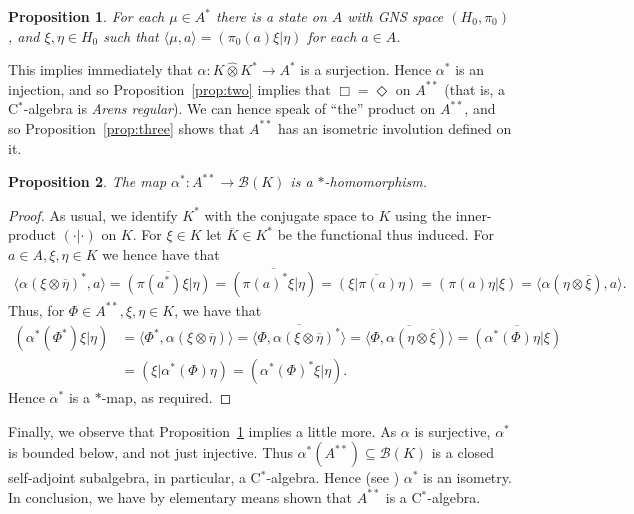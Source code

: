 \documentclass[a4paper,12pt]{article}
\theoremstyle{plain}
\newtheorem{proposition}{Proposition}[section]
\theoremstyle{definition}
\newcommand{\mc}{\mathcal}
\newcommand{\ip}[2]{\langle{#1},{#2}\rangle}
\newcommand{\proten}{\widehat\otimes}
\newcommand{\aone}{\Box}
\newcommand{\atwo}{\Diamond}
\begin{document}
\begin{proposition}\label{prop:one}
For each $\mu\in A^*$ there is a state on $A$ with GNS space $(H_0,\pi_0)$, and
$\xi,\eta\in H_0$ such that $\ip{\mu}{a} = ( \pi_0(a)\xi | \eta )$ for each $a \in A$.
\end{proposition}

This implies immediately that $\alpha:K\proten K^* \rightarrow A^*$ is a surjection.
Hence $\alpha^*$ is an injection, and so Proposition~\ref{prop:two} implies that
$\aone = \atwo$ on $A^{**}$ (that is, a C$^*$-algebra is \emph{Arens regular}).
We can hence speak of ``the'' product on $A^{**}$, and so Proposition~\ref{prop:three}
shows that $A^{**}$ has an isometric involution defined on it.

\begin{proposition}
The map $\alpha^*:A^{**}\rightarrow\mc B(K)$ is a $*$-homomorphism.
\end{proposition}
\begin{proof}
As usual, we identify $K^*$ with the conjugate space to $K$ using the inner-product
$(\cdot|\cdot)$ on $K$.  For $\xi\in K$ let $\overline{K}\in K^*$ be the functional
thus induced.  For $a\in A, \xi,\eta\in K$ we hence have that
\begin{align*}
\ip{\alpha(\xi\otimes\overline\eta)^*}{a}
= \overline{ (\pi(a^*)\xi |\eta) }
= \overline{ (\pi(a)^*\xi |\eta) }
= \overline{ (\xi |\pi(a)\eta) }
= (\pi(a)\eta|\xi)
= \ip{\alpha(\eta\otimes\overline\xi)}{a}.
\end{align*}
Thus, for $\Phi\in A^{**}, \xi,\eta\in K$, we have that
\begin{align*}
(\alpha^*(\Phi^*)\xi|\eta) &= \ip{\Phi^*}{\alpha(\xi\otimes\overline\eta)}
= \overline{ \ip{\Phi}{\alpha(\xi\otimes\overline\eta)^*} }
= \overline{ \ip{\Phi}{\alpha(\eta\otimes\overline\xi)} }
= \overline{ (\alpha^*(\Phi)\eta|\xi) } \\
&= (\xi|\alpha^*(\Phi)\eta)
= (\alpha^*(\Phi)^*\xi|\eta).
\end{align*}
Hence $\alpha^*$ is a $*$-map, as required.
\end{proof}

Finally, we observe that Proposition~\ref{prop:one} implies a little more.
As $\alpha$ is surjective, $\alpha^*$ is bounded below, and not just injective.
Thus $\alpha^*(A^{**}) \subseteq \mc B(K)$ is a closed self-adjoint subalgebra,
in particular, a C$^*$-algebra.  Hence (see \cite[Chapter~1, Section~5]{tak1})
$\alpha^*$ is an isometry.  In conclusion, we have by elementary means shown that
$A^{**}$ is a C$^*$-algebra.
\end{document}
